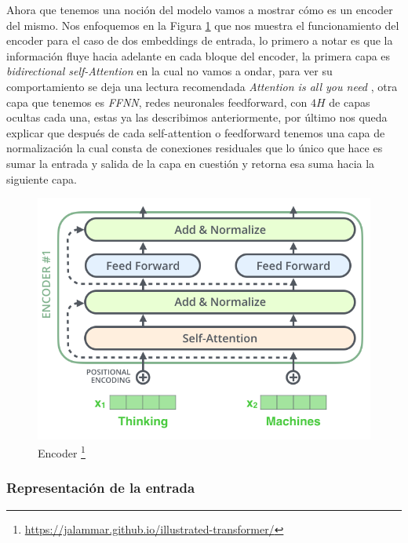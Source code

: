 Ahora que tenemos una noción del modelo vamos a mostrar cómo es un encoder del mismo. Nos enfoquemos en la Figura \ref{fig:encoder_arch} que nos muestra el funcionamiento del encoder para el caso de dos embeddings de entrada, lo primero a notar es que la información fluye hacia adelante en cada bloque del encoder, la primera capa es \textit{bidirectional self-Attention} en la cual no vamos a ondar, para ver su comportamiento se deja una lectura recomendada \textit{Attention is all you need} \cite{DBLP:journals/corr/VaswaniSPUJGKP17}, otra capa que tenemos es \textit{FFNN}, redes neuronales feedforward, con $4H$ de capas ocultas cada una, estas ya las describimos anteriormente, por último nos queda explicar que después de cada self-attention o feedforward tenemos una capa de normalización \cite{ba2016layer} la cual consta de conexiones residuales que lo único que hace es sumar la entrada y salida de la capa en cuestión y retorna esa suma hacia la siguiente capa.


\begin{figure}
\begin{center}
    \includegraphics[width=\textwidth]{images/image217.png}
    \caption{Encoder \footnote{\url{https://jalammar.github.io/illustrated-transformer/}}}
    \label{fig:encoder_arch}
\end{center}
\end{figure}


\subsubsection{Representación de la entrada}

